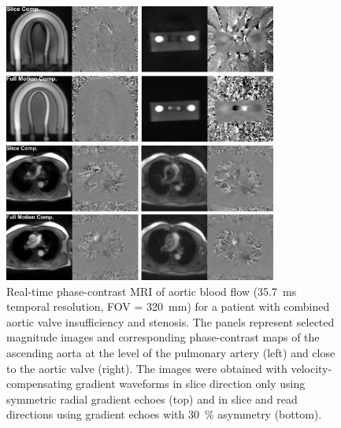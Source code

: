 \begin{figure}[p]
  \centering
  \includegraphics[width=0.80\textwidth]{fig/asym-echo-pha.png}
  \caption{Real-time phase-contrast MRI (\SI{33.3}{\ms} temporal resolution, FOV = \SI{192}{\mm}) of through-plane flow in a phantom with complex flow in the inner small tube. The panels represent selected magnitude images and corresponding phase-contrast maps in a coronal (left) and transverse (right) view at the arch of the inner tube. The images were obtained with velocity-compensating gradient waveforms (top) in slice direction only using symmetric radial gradient echoes and (bottom) in slice and read directions using gradient echoes with \SI{20}{\percent} asymmetry.} \label{Fig:aysm-echo-pha}
  
  \par\bigskip
  
  \includegraphics[width=0.80\textwidth]{fig/asym-echo-pat.png}
  \caption{Real-time phase-contrast MRI of aortic blood flow (\SI{35.7}{\ms} temporal resolution, FOV = \SI{320}{\mm}) for a patient with combined aortic valve insufficiency and stenosis. The panels represent selected magnitude images and corresponding phase-contrast maps of the ascending aorta at the level of the pulmonary artery (left) and close to the aortic valve (right). The images were obtained with velocity-compensating gradient waveforms in slice direction only using symmetric radial gradient echoes (top) and in slice and read directions using gradient echoes with \SI{30}{\percent} asymmetry (bottom).} \label{Fig:aysm-echo-pat}
\end{figure}

